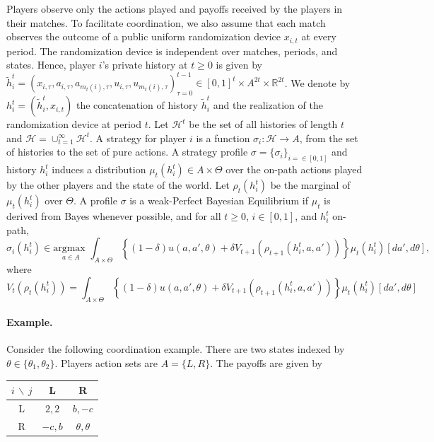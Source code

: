 \documentclass[12pt,letterpaper]{article}
\newcommand{\argmax}[1]{\underset{#1}{\text{argmax }}}
\newcommand{\R}{\mathbb{R}}
\begin{document}
Players observe only the actions played and payoffs received by the players in their matches. To facilitate coordination, we also assume that each match observes the outcome of a public uniform randomization device $x_{i,t}$ at every period. The randomization device is independent over matches, periods, and states. Hence, player $i$'s private history at $t\geq 0$ is given by $
\tilde{h}^t_i=(x_{i,\tau},a_{i,\tau},a_{m_t(i),\tau},u_{i,\tau},u_{m_t(i),\tau})_{\tau=0}^{t-1}\in [0,1]^t \times A^{2t}\times \R^{2t}$. We denote by $h^t_i=(\tilde{h}^t_i,x_{i,t})$ the concatenation of history $\tilde{h}^t_i$ and the realization of the randomization device at period $t$. Let $\mathcal{H}^t$ be the set of all histories of length $t$ and $\mathcal{H}=\cup_{t=1}^{\infty}\mathcal{H}^t$. A strategy for player $i$ is a function $\sigma_i:\mathcal{H}\to A$, from the set of histories to the set of pure actions. A strategy profile $\sigma=\{\sigma_i\}_{i=\in[0,1]}$ and history $h^t_i$ induces a distribution $\mu_{t}(h^t_i)\in A\times \Theta$ over the on-path actions played by the other players and the state of the world. Let $\rho_t(h^t_i)$ be the marginal of $\mu_t(h^t_i)$ over $\Theta$. A profile $\sigma$ is a weak-Perfect Bayesian Equilibrium if $\mu_t$ is derived from Bayes whenever possible, and for all $t\geq 0$,  $i\in[0,1]$, and $h^t_i$ on-path, \begin{equation*}
    \sigma_{i}(h^t_i)\in \argmax{a\in A} \int_{A\times \Theta} \left\{(1-\delta)u(a, a',\theta)+\delta V_{t+1}(\rho_{t+1}(h^t_i,a,a'))\right\}\mu_t(h^t_i)[da',d\theta],
\end{equation*} where \begin{equation*}
    V_t(\rho_t(h^t_i)) = \int_{A\times \Theta} \left\{(1-\delta)u(a, a',\theta)+\delta V_{t+1}(\rho_{t+1}(h^t_i,a,a'))\right\}\mu_t(h^t_i)[da',d\theta]
\end{equation*}

\paragraph{Example.} Consider the following coordination example. There are two states indexed by $\theta\in\{\theta_1,\theta_2\}$. Players action sets are $A=\{L,R\}$. The payoffs are given by 

\begin{table}[H]
    \centering
    \begin{tabular}{|c|c|c|}
        \hline
        $i\,\backslash \, j$  & L & R\\
        \hline
        L & $2,2$ & $b,-c$\\
        \hline
        R & $-c,b$ & $\theta,\theta$\\
        \hline
    \end{tabular}
\end{table}
\end{document}
